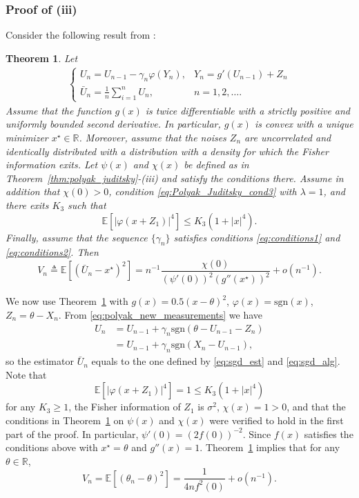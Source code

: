 \documentclass[letterpaper, 11pt]{IEEEtran}      %
\newtheorem{thm}{\bf{Theorem}}
\newcommand{\sgn}{\mathrm{sgn} }
\begin{document}
\subsubsection*{Proof of (iii)}
Consider the following result from \cite{polyak1990new}:
\begin{thm}{\cite[Thm. 2]{polyak1990new}} \label{thm:polyak_new}
Let
\begin{align} \label{eq:polyak_new_measurements}
\begin{cases}
U_n = U_{n-1} - \gamma_n \varphi(Y_n), & Y_n = g'(U_{n-1})+Z_n \\
\bar{U}_n= \frac{1}{n} \sum_{i=1}^n U_n, & n=1,2,\ldots.
\end{cases}
\end{align}
Assume that the function $g(x)$ is twice differentiable with a strictly positive and uniformly bounded second derivative. In particular, $g(x)$ is convex with a unique minimizer $x^\star \in \mathbb R$. Moreover, assume that the noises $Z_n$ are uncorrelated and identically distributed with a distribution with a density for which the Fisher information exits. Let $\psi(x)$ and $\chi(x)$ be defined as in Theorem~\ref{thm:polyak_juditsky}-(iii) and satisfy the conditions there. Assume in addition that $\chi(0)>0$, condition \eqref{eq:Polyak_Juditsky_cond3} with $\lambda = 1$, 
and there exits $K_3$ such that 
\[
\mathbb E \left[ | \varphi(x+Z_1) |^4 \right] \leq K_3(1+|x|^4). 
\]
Finally, assume that the sequence $\{\gamma_n \}$ satisfies conditions \eqref{eq:conditions1} and \eqref{eq:conditions2}. Then
\[
V_n \triangleq \mathbb E \left[ \left(\bar{U}_n-x^\star \right)^2 \right] = n^{-1}\frac{\chi(0)} { (\psi'(0))^2 (g''(x^\star))^2 } + o(n^{-1}).
\]
\end{thm}

We now use Theorem~\ref{thm:polyak_new} with $g(x) = 0.5(x-\theta)^2$, $\varphi(x) = \sgn(x)$, $Z_n = \theta-X_n$. From \eqref{eq:polyak_new_measurements} we have
\begin{align*} 
U_n & = U_{n-1} + \gamma_n \sgn(\theta-U_{n-1} - Z_n )  \\
& = U_{n-1} + \gamma_n \sgn(X_n-U_{n-1} ),
\end{align*}
so the estimator $\bar{U}_n$ equals to the one defined by \eqref{eq:sgd_est} and \eqref{eq:sgd_alg}. Note that
\[
\mathbb E \left[ | \varphi(x+Z_1) |^4 \right] = 1 \leq K_3(1+|x|^4)
\]
for any $K_3\geq 1$, the Fisher information of $Z_1$ is $\sigma^2$, $\chi(x) = 1 > 0$, and that 
the conditions in Theorem~\ref{thm:polyak_new} on $\psi(x)$ and $\chi(x)$ were verified to hold in the first part of the proof. In particular, $\psi'(0) = (2f(0))^{-2}$. Since $f(x)$ satisfies the conditions above with $x^\star = \theta$ and $g''(x) = 1$. Theorem~\ref{thm:polyak_new} implies that for any $\theta \in \mathbb R$, 
\[
V_n = \mathbb E \left[ \left({\theta}_n-\theta \right)^2 \right]  = \frac{1}{4n f^2(0)} + o(n^{-1}).
\]
\end{document}
